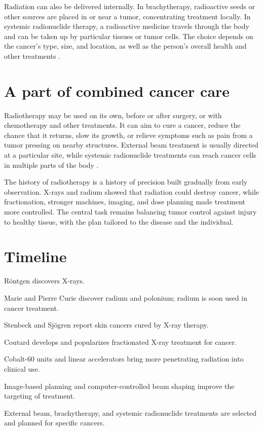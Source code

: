 \documentclass[12pt,oneside]{book}
\begin{document}
Radiation can also be delivered internally. In brachytherapy, radioactive
seeds or other sources are placed in or near a tumor, concentrating treatment
locally. In systemic radionuclide therapy, a radioactive medicine travels
through the body and can be taken up by particular tissues or tumor cells.
The choice depends on the cancer's type, size, and location, as well as the
person's overall health and other treatments
\cite{nciRadiationTherapy}.

\section{A part of combined cancer care}
Radiotherapy may be used on its own, before or after surgery, or with
chemotherapy and other treatments. It can aim to cure a cancer, reduce the
chance that it returns, slow its growth, or relieve symptoms such as pain
from a tumor pressing on nearby structures. External beam treatment is
usually directed at a particular site, while systemic radionuclide
treatments can reach cancer cells in multiple parts of the body
\cite{nciRadiationTherapy}.

The history of radiotherapy is a history of precision built gradually from
early observation. X-rays and radium showed that radiation could destroy
cancer, while fractionation, stronger machines, imaging, and dose planning
made treatment more controlled. The central task remains balancing tumor
control against injury to healthy tissue, with the plan tailored to the
disease and the individual.

\section*{Timeline}
\begin{description}[leftmargin=2.3cm,style=nextline]
  \item[1895] Röntgen discovers X-rays.
  \item[1898] Marie and Pierre Curie discover radium and polonium; radium is soon used in cancer treatment.
  \item[1899] Stenbeck and Sjögren report skin cancers cured by X-ray therapy.
  \item[1920s] Coutard develops and popularizes fractionated X-ray treatment for cancer.
  \item[1950s] Cobalt-60 units and linear accelerators bring more penetrating radiation into clinical use.
  \item[Late 20th century] Image-based planning and computer-controlled beam shaping improve the targeting of treatment.
  \item[Today] External beam, brachytherapy, and systemic radionuclide treatments are selected and planned for specific cancers.
\end{description}
\end{document}
